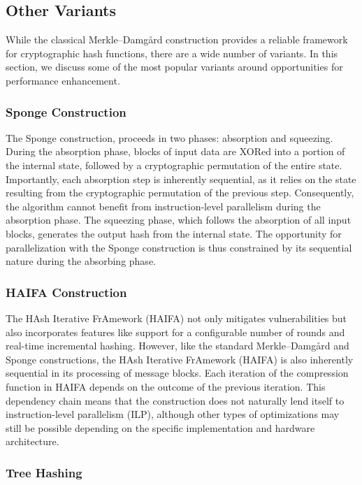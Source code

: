 \documentclass[10pt]{article}
\begin{document}
\subsection{Other Variants}

While the classical Merkle–Damgård construction provides a reliable framework for cryptographic hash functions, there are a wide number of variants\cite{merkle_damgard_alternatives_review}. In this section, we discuss some of the most popular variants around opportunities for performance enhancement.

\subsubsection{Sponge Construction}

The Sponge construction,  proceeds in two phases: absorption and squeezing.
During the absorption phase, blocks of input data are XORed into a portion of the internal state, followed by a cryptographic permutation of the entire state. Importantly, each absorption step is inherently sequential, as it relies on the state resulting from the cryptographic permutation of the previous step. Consequently, the algorithm cannot benefit from instruction-level parallelism during the absorption phase.
The squeezing phase, which follows the absorption of all input blocks, generates the output hash from the internal state.
The opportunity for parallelization with the Sponge construction is thus constrained by its sequential nature during the absorbing phase.

\subsubsection{HAIFA Construction}

The HAsh Iterative FrAmework (HAIFA) not only mitigates vulnerabilities but also incorporates features like support for a configurable number of rounds and real-time incremental hashing.
However, like the standard Merkle–Damgård and Sponge constructions, the HAsh Iterative FrAmework (HAIFA) is also inherently sequential in its processing of message blocks.
Each iteration of the compression function in HAIFA depends on the outcome of the previous iteration.
This dependency chain means that the construction does not naturally lend itself to instruction-level parallelism (ILP), although other types of optimizations may still be possible depending on the specific implementation and hardware architecture.

\subsubsection{Tree Hashing}
\end{document}

